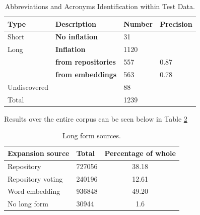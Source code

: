 \begin{table}[h]
\setlength{\tabcolsep}{0.6em}
\caption{Abbreviations and Acronyms Identification within Test Data.}
\label{table:acc_inflation}
\centering
\begin{tabular}{@{}l|l|l|l@{}}
\toprule
Type         & Description                & Number & Precision \\ \midrule

Short        & \textbf{No inflation}      & 31     &           \\
Long         & \textbf{Inflation}         & 1120   &           \\
             & \hspace{3mm}\textbf{from repositories} &\hspace{3mm}557    & 0.87      \\
             &\hspace{3mm}\textbf{from embeddings}   &\hspace{3mm}563    & 0.78      \\
Undiscovered &                            & 88     &           \\
Total        &                            & 1239   &           \\
\bottomrule
\end{tabular}
\end{table}

Results over the entire corpus can be seen below in Table \ref{table:acc_repository}

\begin{table}[h]
\setlength{\tabcolsep}{0.6em}
\caption{Long form sources.}
\label{table:acc_repository}
\centering
\begin{tabular}{@{}l|l|c@{}}
\toprule
\textbf{Expansion source}  & \textbf{Total}  & \textbf{Percentage of whole} \\ \midrule
Repository        & 727056 & 38.18               \\
Repository voting & 240196 & 12.61               \\
Word embedding    & 936848 & 49.20               \\
No long form      & 30944  & 1.6                 \\ \bottomrule
\end{tabular}
\end{table}


